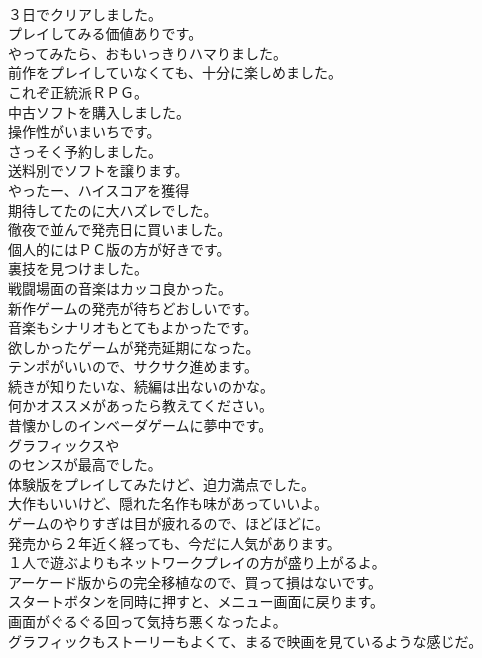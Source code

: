 \documentclass[8pt]{extreport}
\begin{document}
\begin{CJK}{UTF8}{min}
\\	３日でクリアしました。	
\\	プレイしてみる価値ありです。	
\\	やってみたら、おもいっきりハマりました。	
\\	前作をプレイしていなくても、十分に楽しめました。	
\\	これぞ正統派ＲＰＧ。	
\\	中古ソフトを購入しました。	
\\	操作性がいまいちです。	
\\	さっそく予約しました。	
\\	送料別でソフトを譲ります。	
\\	やったー、ハイスコアを獲得	
\\	期待してたのに大ハズレでした。	
\\	徹夜で並んで発売日に買いました。	
\\	個人的にはＰＣ版の方が好きです。	
\\	裏技を見つけました。	
\\	戦闘場面の音楽はカッコ良かった。	
\\	新作ゲームの発売が待ちどおしいです。	
\\	音楽もシナリオもとてもよかったです。	
\\	欲しかったゲームが発売延期になった。	
\\	テンポがいいので、サクサク進めます。	
\\	続きが知りたいな、続編は出ないのかな。	
\\	何かオススメがあったら教えてください。	
\\	昔懐かしのインベーダゲームに夢中です。	
\\	グラフィックスや
\\	のセンスが最高でした。	
\\	体験版をプレイしてみたけど、迫力満点でした。	
\\	大作もいいけど、隠れた名作も味があっていいよ。	
\\	ゲームのやりすぎは目が疲れるので、ほどほどに。	
\\	発売から２年近く経っても、今だに人気があります。	
\\	１人で遊ぶよりもネットワークプレイの方が盛り上がるよ。	
\\	アーケード版からの完全移植なので、買って損はないです。	
\\	スタートボタンを同時に押すと、メニュー画面に戻ります。	
\\	画面がぐるぐる回って気持ち悪くなったよ。	
\\	グラフィックもストーリーもよくて、まるで映画を見ているような感じだ。	

\end{CJK}
\end{document}
